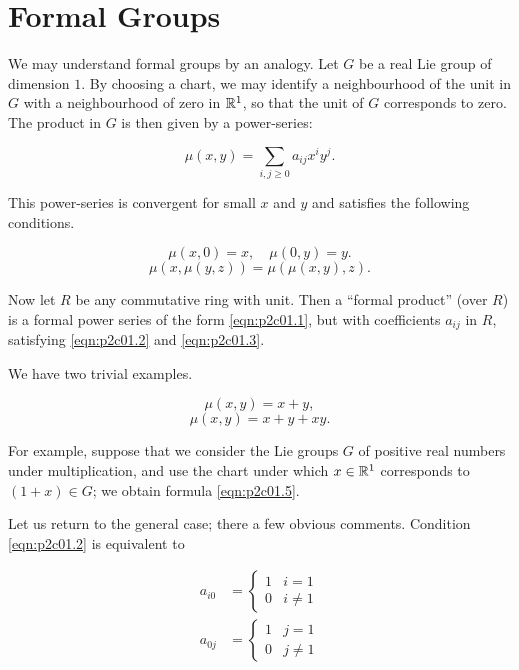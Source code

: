 \documentclass[../main]{subfiles}
\begin{document}
\label{sec:p2c1}

\chapter{Formal Groups}
We may understand formal groups by an analogy. Let $G$ be a real Lie group of dimension $1$. By choosing a chart, we may identify a neighbourhood of the unit in $G$ with a neighbourhood of zero in ${\mathbb{R}}^1$, so that the unit of $G$ corresponds to zero. The product in $G$ is then given by a power-series:

\begin{equation}
\tag{1.1}
\label{eqn:p2c01.1}
\mu(x, y) = \sum_{i, j \ge 0} a_{ij} x^i y^j.
\end{equation}

This power-series is convergent for small $x$ and $y$ and satisfies the following conditions.

\begin{equation}
\tag{1.2}
\label{eqn:p2c01.2}
\mu(x,0) = x, \quad \mu(0, y) = y.
\end{equation}
\begin{equation}
\tag{1.3}
\label{eqn:p2c01.3}
\mu(x, \mu(y, z)) = \mu(\mu(x, y), z).
\end{equation}

Now let $R$ be any commutative ring with unit. Then a ``formal product'' (over $R$) is a formal power series of the form \eqref{eqn:p2c01.1}, but with coefficients $a_{ij}$ in $R$, satisfying \eqref{eqn:p2c01.2} and \eqref{eqn:p2c01.3}. 

We have two trivial examples.

\begin{equation}
\tag{1.4} 
\label{eqn:p2c01.4}
\mu(x, y) = x + y,
\end{equation}
\begin{equation}
\tag{1.5}
\label{eqn:p2c01.5}
\mu(x, y) = x + y + xy.
\end{equation}

For example, suppose that we consider the Lie groups $G$ of positive real numbers under multiplication, and use the chart under which $x \in {\mathbb{R}}^1$ corresponds to $(1 + x) \in G$; we obtain formula \eqref{eqn:p2c01.5}.

Let us return to the general case; there a few obvious comments. Condition \eqref{eqn:p2c01.2} is equivalent to 

\begin{equation}
\tag{1.6}
\begin{split}
a_{i0} & = \begin{cases}1 & i = 1 \\ 0 & i \ne 1\end{cases} \\
a_{0j} & = \begin{cases}1 & j = 1 \\ 0 & j \ne 1\end{cases}
\end{split}
\end{equation}
\end{document}
